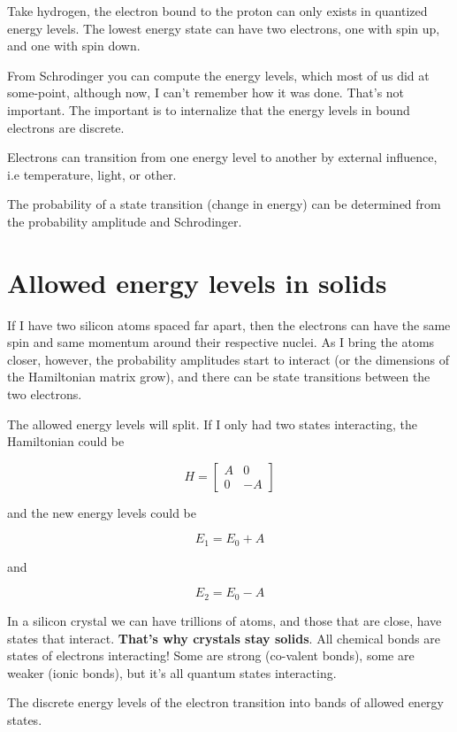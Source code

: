 Take hydrogen, the electron bound to the proton can only exists in
quantized energy levels. The lowest energy state can have two electrons,
one with spin up, and one with spin down.

From Schrodinger you can compute the energy levels, which most of us did
at some-point, although now, I can't remember how it was done. That's
not important. The important is to internalize that the energy levels in
bound electrons are discrete.

Electrons can transition from one energy level to another by external
influence, i.e temperature, light, or other.

The probability of a state transition (change in energy) can be
determined from the probability amplitude and Schrodinger.

\section{Allowed energy levels in
solids}\label{allowed-energy-levels-in-solids}

If I have two silicon atoms spaced far apart, then the electrons can
have the same spin and same momentum around their respective nuclei. As
I bring the atoms closer, however, the probability amplitudes start to
interact (or the dimensions of the Hamiltonian matrix grow), and there
can be state transitions between the two electrons.

The allowed energy levels will split. If I only had two states
interacting, the Hamiltonian could be

\[ H = 
\begin{bmatrix}
A & 0 \\
0 & -A
\end{bmatrix}
\]

and the new energy levels could be

\[ E_1 = E_0 + A\]

and

\[ E_2 = E_0 - A\]

In a silicon crystal we can have trillions of atoms, and those that are
close, have states that interact. \textbf{That's why crystals stay
solids}. All chemical bonds are states of electrons interacting! Some
are strong (co-valent bonds), some are weaker (ionic bonds), but it's
all quantum states interacting.

The discrete energy levels of the electron transition into bands of
allowed energy states.


{
\centering
{}
}

